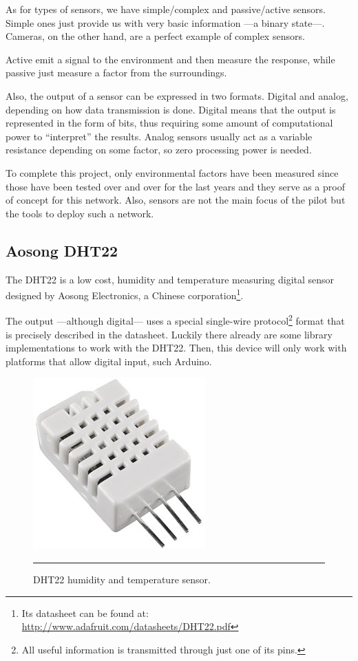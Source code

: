 As for types of sensors, we have simple/complex and passive/active sensors. Simple ones just provide us with very basic information ---a binary state---. Cameras, on the other hand, are a perfect example of complex sensors. 

Active emit a signal to the environment and then measure the response, while passive just measure a factor from the surroundings.

Also, the output of a sensor can be expressed in two formats. Digital and analog, depending on how data transmission is done. Digital  means that the output is represented in the form of bits, thus requiring some amount of computational power to ``interpret'' the results. Analog sensors usually act as a variable resistance depending on some factor, so zero processing power is needed.

To complete this project, only environmental factors have been measured since those have been tested over and over for the last years and they serve as a proof of concept for this network. Also, sensors are not the main focus of the pilot but the tools to deploy such a network.

\subsection{Aosong DHT22}
\label{sub:dht}

The DHT22 is a low cost, humidity and temperature measuring digital sensor designed by Aosong Electronics, a Chinese corporation\footnote{Its datasheet can be found at: \url{http://www.adafruit.com/datasheets/DHT22.pdf}}. 

The output ---although digital--- uses a special single-wire protocol\footnote{All useful information is transmitted through just one of its pins.} format that is precisely described in the datasheet. Luckily there already are some library implementations to work with the DHT22. Then, this device will only work with platforms that allow digital input, such Arduino.

\begin{figure}[htbp]
    \centering
        \includegraphics[scale=0.8]{./Figures/dht22.jpg}
        \rule{35em}{0.5pt}
    \caption[DHT22 sensor]{DHT22 humidity and temperature sensor.}
    \label{fig:DHT22}
\end{figure}



